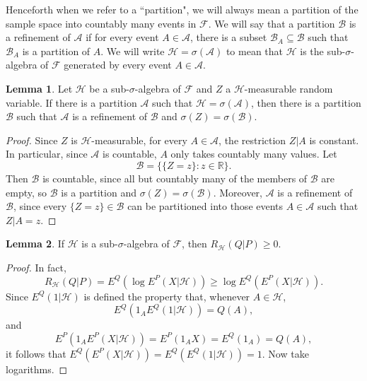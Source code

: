 \documentclass[10pt]{article}
\newcommand{\RR}{\mathbb{R}}
\theoremstyle{definition}
\newtheorem{lemma}{Lemma}[exer]
\begin{document}
Henceforth when we refer to a ``partition", we will always mean a partition of the sample space into countably many events in $\mathcal F$.
We will say that a partition $\mathcal B$ is a refinement of $\mathcal A$ if for every event $A \in \mathcal A$, there is a subset $\mathcal B_A \subseteq \mathcal B$ such that $\mathcal B_A$ is a partition of $A$.
We will write $\mathcal H = \sigma(\mathcal A)$ to mean that $\mathcal H$ is the sub-$\sigma$-algebra of $\mathcal F$ generated by every event $A \in \mathcal A$.

\begin{lemma}
Let $\mathcal H$ be a sub-$\sigma$-algebra of $\mathcal F$ and $Z$ a $\mathcal H$-measurable random variable.
If there is a partition $\mathcal A$ such that $\mathcal H = \sigma(\mathcal A)$, then there is a partition $\mathcal B$ such that $\mathcal A$ is a refinement of $\mathcal B$ and $\sigma(Z) = \sigma(\mathcal B)$.
\end{lemma}
\begin{proof}
Since $Z$ is $\mathcal H$-measurable, for every $A \in \mathcal A$, the restriction $Z|A$ is constant.
In particular, since $\mathcal A$ is countable, $A$ only takes countably many values.
Let
$$\mathcal B = \{\{Z = z\}: z \in \RR\}.$$
Then $\mathcal B$ is countable, since all but countably many of the members of $\mathcal B$ are empty, so $\mathcal B$ is a partition and $\sigma(Z) = \sigma(\mathcal B)$.
Moreover, $\mathcal A$ is a refinement of $\mathcal B$, since every $\{Z = z\} \in \mathcal B$ can be partitioned into those events $A \in \mathcal A$ such that $Z|A = z$.
\end{proof}

\begin{lemma}
If $\mathcal H$ is a sub-$\sigma$-algebra of $\mathcal F$, then $R_{\mathcal H}(Q|P) \geq 0$.
\end{lemma}
\begin{proof}
In fact,
$$R_{\mathcal H}(Q|P) = E^Q(\log E^P(X|\mathcal H)) \geq \log E^Q(E^P(X|\mathcal H)).$$
Since $E^Q(1|\mathcal H)$ is defined the property that, whenever $A \in \mathcal H$,
$$E^Q(1_A E^Q(1|\mathcal H)) = Q(A),$$
and
$$E^P(1_A E^P(X|\mathcal H)) = E^P(1_A X) = E^Q(1_A) = Q(A),$$
it follows that $E^Q(E^P(X|\mathcal H)) = E^Q(E^Q(1|\mathcal H)) = 1$.
Now take logarithms.
\end{proof}
\end{document}
